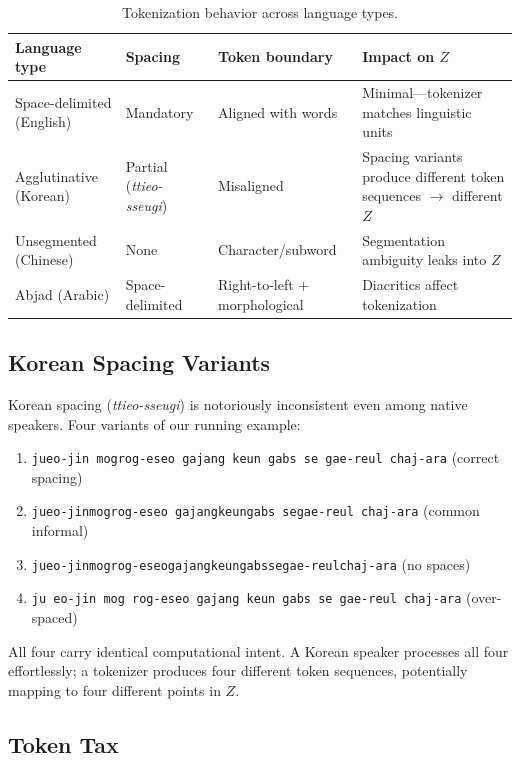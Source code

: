 \documentclass[11pt]{article}
\theoremstyle{definition}
\begin{document}
\begin{table}[h]
\centering
\caption{Tokenization behavior across language types.}
\label{tab:tokenization}
\small
\begin{tabularx}{\textwidth}{l l l L}
\toprule
\textbf{Language type} & \textbf{Spacing} & \textbf{Token boundary} & \textbf{Impact on $Z$} \\
\midrule
Space-delimited (English) & Mandatory & Aligned with words & Minimal---tokenizer matches linguistic units \\
Agglutinative (Korean) & Partial (\emph{ttieo-sseugi}) & Misaligned & Spacing variants produce different token sequences $\to$ different $Z$ \\
Unsegmented (Chinese) & None & Character/subword & Segmentation ambiguity leaks into $Z$ \\
Abjad (Arabic) & Space-delimited & Right-to-left + morphological & Diacritics affect tokenization \\
\bottomrule
\end{tabularx}
\end{table}

\subsection{Korean Spacing Variants}

Korean spacing (\emph{ttieo-sseugi}) is notoriously inconsistent even among native speakers. Four variants of our running example:

\begin{enumerate}[nosep]
  \item \texttt{jueo-jin mogrog-eseo gajang keun gabs se gae-reul chaj-ara} (correct spacing)
  \item \texttt{jueo-jinmogrog-eseo gajangkeungabs segae-reul chaj-ara} (common informal)
  \item \texttt{jueo-jinmogrog-eseogajangkeungabssegae-reulchaj-ara} (no spaces)
  \item \texttt{ju eo-jin mog rog-eseo gajang keun gabs se gae-reul chaj-ara} (over-spaced)
\end{enumerate}

All four carry identical computational intent. A Korean speaker processes all four effortlessly; a tokenizer produces four different token sequences, potentially mapping to four different points in $Z$.

\subsection{Token Tax}
\end{document}
